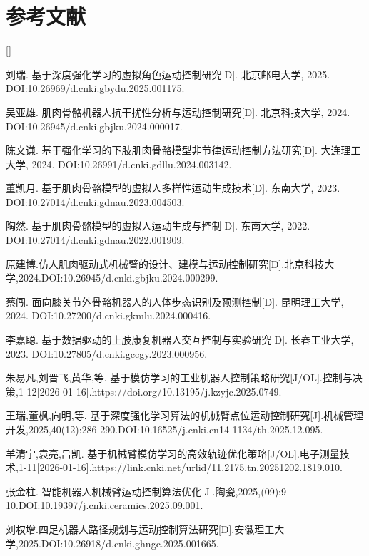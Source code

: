 
\chapter*{参考文献}
\sloppy
{}
\begin{list}{[]}{\setlength{\leftmargin}{2.6em}\setlength{\labelwidth}{2.2em}\setlength{\labelsep}{0.4em}\setlength{\itemsep}{0pt}\setlength{\parsep}{0pt}}
\item 刘瑞. 基于深度强化学习的虚拟角色运动控制研究[D]. 北京邮电大学, 2025. DOI:10.26969/d.cnki.gbydu.2025.001175.
\item 吴亚雄. 肌肉骨骼机器人抗干扰性分析与运动控制研究[D]. 北京科技大学, 2024. DOI:10.26945/d.cnki.gbjku.2024.000017.
\item 陈文谦. 基于强化学习的下肢肌肉骨骼模型非节律运动控制方法研究[D]. 大连理工大学, 2024. DOI:10.26991/d.cnki.gdllu.2024.003142.
\item 董凯月. 基于肌肉骨骼模型的虚拟人多样性运动生成技术[D]. 东南大学, 2023. DOI:10.27014/d.cnki.gdnau.2023.004503.
\item 陶然. 基于肌肉骨骼模型的虚拟人运动生成与控制[D]. 东南大学, 2022. DOI:10.27014/d.cnki.gdnau.2022.001909.
\item 原建博.仿人肌肉驱动式机械臂的设计、建模与运动控制研究[D].北京科技大学,2024.DOI:10.26945/d.cnki.gbjku.2024.000299.
\item 蔡闯. 面向膝关节外骨骼机器人的人体步态识别及预测控制[D]. 昆明理工大学, 2024. DOI:10.27200/d.cnki.gkmlu.2024.000416.
\item 李嘉聪. 基于数据驱动的上肢康复机器人交互控制与实验研究[D]. 长春工业大学, 2023. DOI:10.27805/d.cnki.gccgy.2023.000956.
\item 朱易凡,刘晋飞,黄华,等. 基于模仿学习的工业机器人控制策略研究[J/OL].控制与决策,1-12[2026-01-16].https://doi.org/10.13195/j.kzyjc.2025.0749.
\item 王瑞,董枫,向明,等. 基于深度强化学习算法的机械臂点位运动控制研究[J].机械管理开发,2025,40(12):286-290.DOI:10.16525/j.cnki.cn14-1134/th.2025.12.095.
\item 羊清宇,袁亮,吕凯. 基于机械臂模仿学习的高效轨迹优化策略[J/OL].电子测量技术,1-11[2026-01-16].https://link.cnki.net/urlid/11.2175.tn.20251202.1819.010.
\item 张金柱. 智能机器人机械臂运动控制算法优化[J].陶瓷,2025,(09):9-10.DOI:10.19397/j.cnki.ceramics.2025.09.001.
\item 刘权增.四足机器人路径规划与运动控制算法研究[D].安徽理工大学,2025.DOI:10.26918/d.cnki.ghngc.2025.001665.

\end{list}
